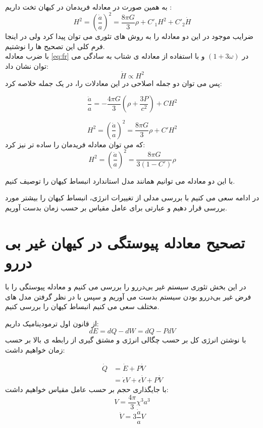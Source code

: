 \documentclass[12pt]{article}
\begin{document}
به همین صورت در معادله فریدمان در کیهان تخت داریم :
\begin{equation}\label{eq:fr}
H^2=(\frac{\dot a}{a})^2=\frac{8\pi G}{3}\rho+C'_1H^2+C'_2 \dot H
\end{equation}
ضرایب موجود در این دو معادله را به روش های تئوری می توان پیدا کرد ولی در اینجا فرم کلی این تصحیح ها را نوشتیم.\\
با ضرب معادله
 \eqref{eq:fr}
 در 
$(1+3\omega)$
 و با استفاده از معادله ی شتاب به سادگی می توان نشان داد:
$$\dot H\propto H^2$$
پس می توان دو جمله اصلاحی در این معادلات را، در یک جمله خلاصه کرد:

\begin{equation}\label{addot}
\frac{\ddot a}{a}=-\frac{4\pi G}{3}(\rho + \frac{3P}{c^2})+CH^2
\end{equation}

\begin{equation}
H^2=(\frac{\dot a}{a})^2=\frac{8\pi G}{3}\rho+C'H^2
\end{equation}
که می توان معادله فریدمان را ساده تر نیز کرد:
\begin{equation}\label{eq:frc}
H^2=(\frac{\dot a}{a})^2=\frac{8\pi G}{3(1-C')}\rho
\end{equation}

با این دو معادله می توانیم همانند مدل استاندارد انبساط کیهان را توصیف کنیم.

در ادامه سعی می کنیم با بررسی مدلی از تغییرات انرژی، انبساط کیهان را بیشتر مورد بررسی قرار دهیم و عبارتی برای عامل مقیاس بر حسب زمان بدست آوریم.
\pagebreak
\section{تصحیح معادله پیوستگی در کیهان غیر بی دررو}
در این بخش تئوری سیستم غیر بی‌دررو را بررسی می کنیم و معادله پیوستگی را با فرض غیر بی‌دررو بودن سیستم بدست می آوریم و سپس با در نظر گرفتن مدل های مختلف 
سعی می کنیم انبساط کیهان را بررسی کنیم.

از قانون اول ترمودینامیک داریم:
\begin{equation}
dE=dQ-dW=dQ-PdV
\end{equation}
با نوشتن انرژی کل بر حسب چگالی انرژی و مشتق گیری از رابطه ی بالا بر حسب زمان خواهیم داشت:

\begin{align}
\dot Q&=\dot E+P\dot V \nonumber \\
		&=\dot\epsilon V+\epsilon\dot V+P\dot V	
\end{align}
 با جایگذاری حجم بر حسب عامل مقیاس خواهیم داشت:
$$V=\frac{4\pi}{3}\chi^3a^3$$
$$\dot V=3\frac{\dot a}{a}V$$
\end{document}
